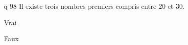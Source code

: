 \begin{truefalse}{q-98}
Il existe trois nombres premiers compris entre $20$ et $30$.
\item Vrai
\item* Faux
\end{truefalse}

